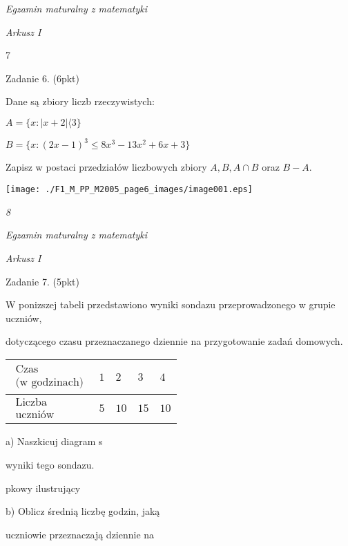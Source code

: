 \documentclass[a4paper,12pt]{article}
\begin{document}
{\it Egzamin maturalny z matematyki}

{\it Arkusz I}

7

Zadanie 6. (6pkt)

Dane są zbiory liczb rzeczywistych:

$A=\{x:|x+2|\langle 3\}$

$B=\{x:(2x-1)^{3}\leq 8x^{3}-13x^{2}+6x+3\}$

Zapisz w postaci przedziałów liczbowych zbiory $A, B, A\cap B$ oraz $B-A.$
\begin{center}
\texttt{[image: ./F1\_M\_PP\_M2005\_page6\_images/image001.eps]}
\end{center}




{\it 8}

{\it Egzamin maturalny z matematyki}

{\it Arkusz I}

Zadanie 7. (5pkt)

W ponizszej tabeli przedstawiono wyniki sondazu przeprowadzonego w grupie uczniów,

dotyczącego czasu przeznaczanego dziennie na przygotowanie zadań domowych.
\begin{center}
\begin{tabular}{|l|l|l|l|l|}
\hline
\multicolumn{1}{|l|}{$\begin{array}{l}\mbox{Czas}	\\	\mbox{(w godzinach)}	\end{array}$}&	\multicolumn{1}{|l|}{ $1$}&	\multicolumn{1}{|l|}{ $2$}&	\multicolumn{1}{|l|}{ $3$}&	\multicolumn{1}{|l|}{ $4$}	\\
\hline
\multicolumn{1}{|l|}{$\begin{array}{l}\mbox{Liczba}	\\	\mbox{uczniów}	\end{array}$}&	\multicolumn{1}{|l|}{ $5$}&	\multicolumn{1}{|l|}{ $10$}&	\multicolumn{1}{|l|}{ $15$}&	\multicolumn{1}{|l|}{ $10$}	\\
\hline
\end{tabular}

\end{center}
a) Naszkicuj diagram s

wyniki tego sondazu.

pkowy ilustrujący

b) Oblicz średnią liczbę godzin, jaką

uczniowie przeznaczają dziennie na
\end{document}
